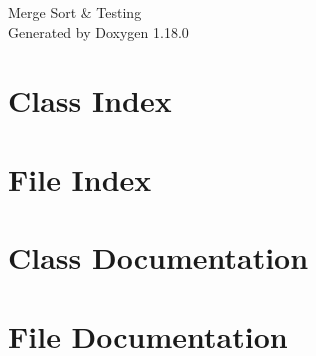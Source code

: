 \documentclass[twoside]{book}
\newcommand{\+}{\discretionary{\mbox{\scriptsize$\hookleftarrow$}}{}{}}
\newcommand{\clearemptydoublepage}{%
    \newpage{\pagestyle{empty}\cleardoublepage}%
  }
\begin{document}
  \raggedbottom
  \begin{titlepage}
  \vspace*{7cm}
  \begin{center}%
  {\Large Merge Sort \& Testing}\\
  \vspace*{1cm}
  {\large Generated by Doxygen 1.18.0}\\
  \end{center}
  \end{titlepage}
  \clearemptydoublepage
  \tableofcontents
  \clearemptydoublepage
\chapter{Class Index}

\chapter{File Index}

\chapter{Class Documentation}

\chapter{File Documentation}






  \backmatter
  \newpage
  \clearemptydoublepage
  \printindex
\end{document}
